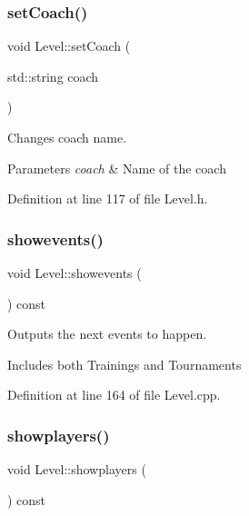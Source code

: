 \subsubsection{\texorpdfstring{set\+Coach()}{setCoach()}}
{\footnotesize\ttfamily void Level\+::set\+Coach (\begin{DoxyParamCaption}\item[{std\+::string}]{coach }\end{DoxyParamCaption})\hspace{0.3cm}{\ttfamily [inline]}}



Changes coach name. 


\begin{DoxyParams}{Parameters}
{\em coach} & Name of the coach \\
\hline
\end{DoxyParams}


Definition at line 117 of file Level.\+h.

\hypertarget{class_level_a8115b8f2e69ce1fdc21c64525c61a957}{}\label{class_level_a8115b8f2e69ce1fdc21c64525c61a957} 
\subsubsection{\texorpdfstring{showevents()}{showevents()}}
{\footnotesize\ttfamily void Level\+::showevents (\begin{DoxyParamCaption}{ }\end{DoxyParamCaption}) const\hspace{0.3cm}{\ttfamily [virtual]}}



Outputs the next events to happen. 

Includes both Trainings and Tournaments 

Definition at line 164 of file Level.\+cpp.

\hypertarget{class_level_a40d22b376e72950a07de5e0a9e288029}{}\label{class_level_a40d22b376e72950a07de5e0a9e288029} 
\subsubsection{\texorpdfstring{showplayers()}{showplayers()}}
{\footnotesize\ttfamily void Level\+::showplayers (\begin{DoxyParamCaption}{ }\end{DoxyParamCaption}) const\hspace{0.3cm}{\ttfamily [virtual]}}



